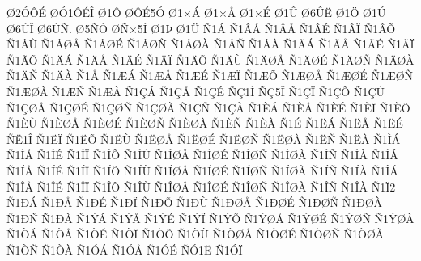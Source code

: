 {^^d82^^d3^^d4^^c9
^^d8^^d31^^d4^^c9^^ce
^^d81^^d4
^^d8^^d4^^c95^^d3
^^d81^^d7^^c1
^^d81^^d7^^c5
^^d81^^d7^^c9
^^d81^^db
^^d86^^db^^cb
^^d81^^d6
^^d81^^da
^^d86^^da^^ce
^^d86^^da^^d1.
^^d85^^d1^^d3
^^d8^^d1^^d75^^cc
^^d81^^de
^^d81^^dc
^^d11^^c1
^^d11^^c2^^c1
^^d11^^c2^^c5
^^d11^^c2^^c9
^^d11^^c2^^cf
^^d11^^c2^^d5
^^d11^^c2^^d9
^^d11^^c2^^d8^^c5
^^d11^^c2^^d8^^c9
^^d11^^c2^^d8^^d1
^^d11^^c2^^d8^^c0
^^d11^^c2^^d1
^^d11^^c2^^c0
^^d11^^c3^^c1
^^d11^^c3^^c5
^^d11^^c3^^c9
^^d11^^c3^^cf
^^d11^^c3^^d5
^^d11^^c4^^c1
^^d11^^c4^^c5
^^d11^^c4^^c9
^^d11^^c4^^cf
^^d11^^c4^^d5
^^d11^^c4^^d9
^^d11^^c4^^d8^^c5
^^d11^^c4^^d8^^c9
^^d11^^c4^^d8^^d1
^^d11^^c4^^d8^^c0
^^d11^^c4^^d1
^^d11^^c4^^c0
^^d11^^c5
^^d11^^c6^^c1
^^d11^^c6^^c5
^^d11^^c6^^c9
^^d11^^c6^^cf
^^d11^^c6^^d5
^^d11^^c6^^d8^^c5
^^d11^^c6^^d8^^c9
^^d11^^c6^^d8^^d1
^^d11^^c6^^d8^^c0
^^d11^^c6^^d1
^^d11^^c6^^c0
^^d11^^c7^^c1
^^d11^^c7^^c5
^^d11^^c7^^c9
^^d1^^c71^^cc
^^d1^^c75^^ce
^^d11^^c7^^cf
^^d11^^c7^^d5
^^d11^^c7^^d9
^^d11^^c7^^d8^^c5
^^d11^^c7^^d8^^c9
^^d11^^c7^^d8^^d1
^^d11^^c7^^d8^^c0
^^d11^^c7^^d1
^^d11^^c7^^c0
^^d11^^c8^^c1
^^d11^^c8^^c5
^^d11^^c8^^c9
^^d11^^c8^^cf
^^d11^^c8^^d5
^^d11^^c8^^d9
^^d11^^c8^^d8^^c5
^^d11^^c8^^d8^^c9
^^d11^^c8^^d8^^d1
^^d11^^c8^^d8^^c0
^^d11^^c8^^d1
^^d11^^c8^^c0
^^d11^^c9
^^d11^^cb^^c1
^^d11^^cb^^c5
^^d11^^cb^^c9
^^d1^^cb1^^ce
^^d11^^cb^^cf
^^d11^^cb^^d5
^^d11^^cb^^d9
^^d11^^cb^^d8^^c5
^^d11^^cb^^d8^^c9
^^d11^^cb^^d8^^d1
^^d11^^cb^^d8^^c0
^^d11^^cb^^d1
^^d11^^cb^^c0
^^d11^^cc^^c1
^^d11^^cc^^c5
^^d11^^cc^^c9
^^d11^^cc^^cf
^^d11^^cc^^d5
^^d11^^cc^^d9
^^d11^^cc^^d8^^c5
^^d11^^cc^^d8^^c9
^^d11^^cc^^d8^^d1
^^d11^^cc^^d8^^c0
^^d11^^cc^^d1
^^d11^^cc^^c0
^^d11^^cd^^c1
^^d11^^cd^^c5
^^d11^^cd^^c9
^^d11^^cd^^cf
^^d11^^cd^^d5
^^d11^^cd^^d9
^^d11^^cd^^d8^^c5
^^d11^^cd^^d8^^c9
^^d11^^cd^^d8^^d1
^^d11^^cd^^d8^^c0
^^d11^^cd^^d1
^^d11^^cd^^c0
^^d11^^ce^^c1
^^d11^^ce^^c5
^^d11^^ce^^c9
^^d11^^ce^^cf
^^d11^^ce^^d5
^^d11^^ce^^d9
^^d11^^ce^^d8^^c5
^^d11^^ce^^d8^^c9
^^d11^^ce^^d8^^d1
^^d11^^ce^^d8^^c0
^^d11^^ce^^d1
^^d11^^ce^^c0
^^d11^^cf2
^^d11^^d0^^c1
^^d11^^d0^^c5
^^d11^^d0^^c9
^^d11^^d0^^cf
^^d11^^d0^^d5
^^d11^^d0^^d9
^^d11^^d0^^d8^^c5
^^d11^^d0^^d8^^c9
^^d11^^d0^^d8^^d1
^^d11^^d0^^d8^^c0
^^d11^^d0^^d1
^^d11^^d0^^c0
^^d11^^dd^^c1
^^d11^^dd^^c5
^^d11^^dd^^c9
^^d11^^dd^^cf
^^d11^^dd^^d5
^^d11^^dd^^d8^^c5
^^d11^^dd^^d8^^c9
^^d11^^dd^^d8^^d1
^^d11^^dd^^d8^^c0
^^d11^^d2^^c1
^^d11^^d2^^c5
^^d11^^d2^^c9
^^d11^^d2^^cf
^^d11^^d2^^d5
^^d11^^d2^^d9
^^d11^^d2^^d8^^c5
^^d11^^d2^^d8^^c9
^^d11^^d2^^d8^^d1
^^d11^^d2^^d8^^c0
^^d11^^d2^^d1
^^d11^^d2^^c0
^^d11^^d3^^c1
^^d11^^d3^^c5
^^d11^^d3^^c9
^^d1^^d31^^cb
^^d11^^d3^^cf
}
